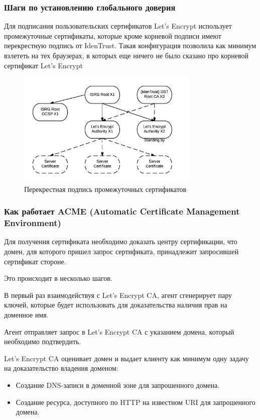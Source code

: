 \documentclass[10pt, a5paper]{article}
\begin{document}
\subsubsection*{Шаги по установлению глобального доверия}

Для подписания пользовательских сертификатов Let’s Encrypt использует промежуточные сертификаты, которые кроме корневой подписи имеют перекрестную подпись от IdenTrust. Такая конфигурация позволила как минимум взлететь на тех браузерах, в которых еще ничего не было сказано про корневой сертификат Let’s Encrypt \footnotemark[4]

\begin{figure}[h!]
  \centering
  \includegraphics[height=5.5cm]{w_03_2016_Kharkevich6.png}
\caption*{Перекрестная подпись промежуточных сертификатов}\label{fig:Kharkevich6}
\end{figure}


\subsubsection*{Как работает ACME (Automatic Certificate Management Environment)}

Для получения  сертификата необходимо доказать центру сертификации, что домен, для которого пришел запрос сертификата, принадлежит запросившей сертификат стороне.

Это происходит в несколько шагов.

В первый раз взаимодействуя с Let's Encrypt CA, агент сгенерирует пару ключей, которые будет использовать для доказательства наличия прав на доменное имя.

Агент отправляет запрос в Let's Encrypt CA с указанием домена, который необходимо подтвердить.

Let’s Encrypt CA оценивает домен и выдает клиенту как минимум одну задачу на доказательство владения доменом:

\begin{itemize}
  \item Создание DNS-записи в доменной зоне для запрошенного домена.
  \item Создание ресурса, доступного по HTTP на известном URI для запрошенного домена.
\end{itemize}
\end{document}
